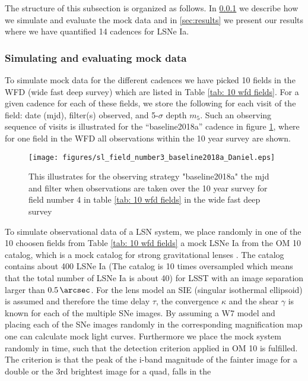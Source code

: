 The structure of this subsection is organized as follows. In
\ref{sec:simulation of mock data} we describe how we simulate and
evaluate the mock data and in \ref{sec:results} we present our results
where we have quantified 14 cadences for LSNe Ia.

\subsubsection{Simulating and evaluating mock data}
\label{sec:simulation of mock data}
To simulate mock data for the different cadences we have picked 10
fields in the WFD (wide fast deep survey) which are listed in Table
\ref{tab: 10 wfd fields}. For a given cadence for each of these
fields, we store the following for each visit of the field: date
(mjd), filter(s) observed, and 5-$\sigma$ depth $m_5$. Such an
observing sequence of visits is illustrated for the ``baseline2018a''
cadence in figure \ref{fig:observation patter LSST 10 year survey},
where for one field in the WFD all observations within the 10 year
survey are shown. 
%
\begin{figure}
\centering
\texttt{[image: figures/sl\_field\_number3\_baseline2018a\_Daniel.eps]}
\caption{This illustrates for the observing strategy "baseline2018a" the mjd and filter when observations are taken over the 10 year survey for field number 4 in table \ref{tab: 10 wfd fields} in the wide fast deep survey}
\label{fig:observation patter LSST 10 year survey}
\end{figure}
%
To simulate observational data of a LSN system, we place randomly in
one of the 10 choosen fields from Table \ref{tab: 10 wfd fields} a
mock LSNe Ia from the OM 10 catalog, which is a mock catalog for
strong gravitational lenses \citep{Oguri:2010}. The catalog contains
about 400 LSNe Ia (The catalog is 10 times oversampled which means
that the total number of LSNe Ia is about 40) for LSST with an image
separation larger than $\SI{0.5}{\arcsec}$. For the lens model an SIE
(singular isothermal ellipsoid) \citep{Kormann:1994} is assumed and
therefore the time delay $\tau$, the convergence $\kappa$ and the
shear $\gamma$ is known for each of the multiple SNe images. By
assuming a W7 model and placing each of the SNe images randomly in the
corresponding magnification map one can calculate mock light
curves. Furthermore we place the mock system randomly in time, such
that the detection criterion applied in OM 10 is fulfilled. The
criterion is that the peak of the i-band magnitude of the fainter image
for a double or the 3rd brightest image for a quad, falls in the
